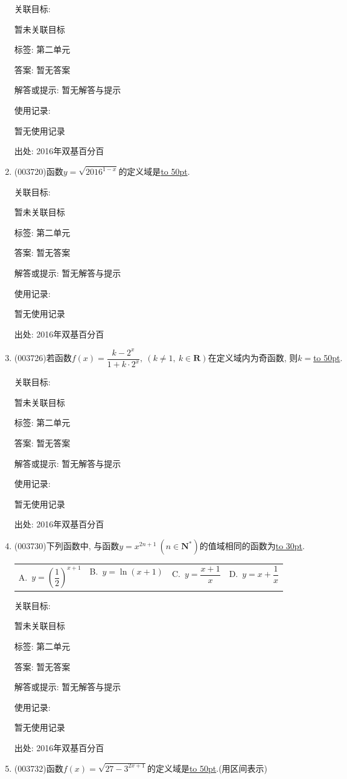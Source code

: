 \documentclass[10pt,a4paper]{article}
\newcommand{\blank}[1]{\underline{\hbox to #1pt{}}}
\newcommand{\fourch}[4]{\par\begin{tabular}{p{.23\textwidth}p{.23\textwidth}p{.23\textwidth}p{.23\textwidth}}
A.~#1 &B.~#2& C.~#3& D.~#4
\end{tabular}}
\begin{document}
\begin{enumerate}[1.]
关联目标:

暂未关联目标



标签: 第二单元

答案: 暂无答案

解答或提示: 暂无解答与提示

使用记录:

暂无使用记录


出处: 2016年双基百分百
\item { (003720)}函数$y=\sqrt{2016^{1-x}}$的定义域是\blank{50}.


关联目标:

暂未关联目标



标签: 第二单元

答案: 暂无答案

解答或提示: 暂无解答与提示

使用记录:

暂无使用记录


出处: 2016年双基百分百
\item { (003726)}若函数$f(x)=\dfrac{k-2^x}{1+k\cdot 2^x}, \ (k\ne 1, \ k\in \mathbf{R})$在定义域内为奇函数, 则$k=$\blank{50}.


关联目标:

暂未关联目标



标签: 第二单元

答案: 暂无答案

解答或提示: 暂无解答与提示

使用记录:

暂无使用记录


出处: 2016年双基百分百
\item { (003730)}下列函数中, 与函数$y=x^{2n+1} \ (n\in \mathbf{N}^*)$的值域相同的函数为\blank{30}.
\fourch{$y=\left(\dfrac 12\right)^{x+1}$}{$y=\ln(x+1)$}{$y=\dfrac{x+1}{x}$}{$y=x+\dfrac 1x$}


关联目标:

暂未关联目标



标签: 第二单元

答案: 暂无答案

解答或提示: 暂无解答与提示

使用记录:

暂无使用记录


出处: 2016年双基百分百
\item { (003732)}函数$f(x)=\sqrt{27-3^{2x+1}}$的定义域是\blank{50}.(用区间表示)



\end{enumerate}
\end{document}
